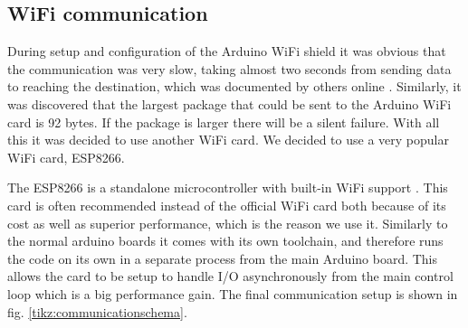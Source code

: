 \documentclass[11pt]{article}
\begin{document}
\subsection{WiFi communication}
During setup and configuration of the Arduino WiFi shield it was obvious that the communication was very slow, taking almost two seconds from sending data to reaching the destination, which was documented by others online \cite{wificard1,wificard2}. Similarly, it was discovered that the largest package that could be sent to the Arduino WiFi card is 92 bytes. If the package is larger there will be a silent failure. With all this it was decided to use another WiFi card. We decided to use a very popular WiFi card, ESP8266. \par

The ESP8266 is a standalone microcontroller with built-in WiFi support \cite{ESP8266}. This card is often recommended instead of the official WiFi card both because of its cost as well as superior performance, which is the reason we use it. Similarly to the normal arduino boards it comes with its own toolchain, and therefore runs the code on its own in a separate process from the main Arduino  board. This allows the card to be setup to handle I/O asynchronously from the main control loop which is a big performance gain. The final communication setup is shown in fig. \vref{tikz:communicationschema}.\par
\end{document}
